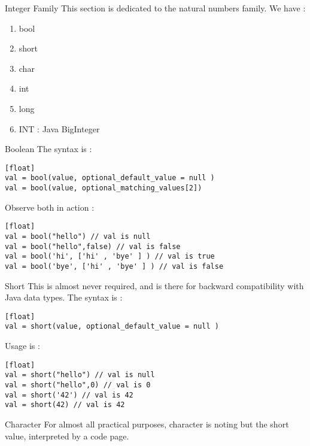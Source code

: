 \begin{section}{Integer Family}
This section is dedicated to the natural numbers family.
We have :
\begin{enumerate}
\item{bool}
\item{short}
\item{char}
\item{int}
\item{long}
\item{INT : Java BigInteger}
\end{enumerate}

\begin{subsection}{Boolean}
The syntax is :
\begin{lstlisting}[style=JexlStyle][float]
val = bool(value, optional_default_value = null )
val = bool(value, optional_matching_values[2])
\end{lstlisting}
Observe both in action :

\begin{lstlisting}[style=JexlStyle][float]
val = bool("hello") // val is null
val = bool("hello",false) // val is false
val = bool('hi', ['hi' , 'bye' ] ) // val is true 
val = bool('bye', ['hi' , 'bye' ] ) // val is false 
\end{lstlisting}

\end{subsection}

\begin{subsection}{Short}
This is almost never required, and is there for backward compatibility with Java data types.
The syntax is :

\begin{lstlisting}[style=JexlStyle][float]
val = short(value, optional_default_value = null )
\end{lstlisting}

Usage is :

\begin{lstlisting}[style=JexlStyle][float]
val = short("hello") // val is null
val = short("hello",0) // val is 0
val = short('42') // val is 42 
val = short(42) // val is 42 
\end{lstlisting}

\end{subsection}

\begin{subsection}{Character}
For almost all practical purposes, character is noting but the short value, 
interpreted by a code page.


\end{subsection}
\end{section}
